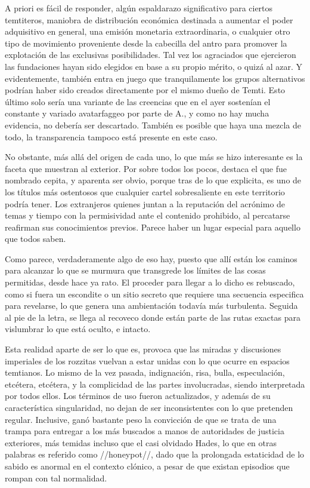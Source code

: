 \documentclass[
]{book}
\begin{document}
A priori es fácil de responder, algún espaldarazo significativo para ciertos temtiteros, maniobra de distribución económica destinada a aumentar el poder adquisitivo en general, una emisión monetaria extraordinaria, o cualquier otro tipo de movimiento proveniente desde la cabecilla del antro para promover la explotación de las exclusivas posibilidades. Tal vez los agraciados que ejercieron las fundaciones hayan sido elegidos en base a su propio mérito, o quizá al azar. Y evidentemente, también entra en juego que tranquilamente los grupos alternativos podrían haber sido creados directamente por el mismo dueño de Temti. Esto último solo sería una variante de las creencias que en el ayer sostenían el constante y variado avatarfaggeo por parte de A., y como no hay mucha evidencia, no debería ser descartado. También es posible que haya una mezcla de todo, la transparencia tampoco está presente en este caso.

No obstante, más allá del origen de cada uno, lo que más se hizo interesante es la faceta que muestran al exterior. Por sobre todos los pocos, destaca el que fue nombrado cepita, y aparenta ser obvio, porque tras de lo que explicita, es uno de los títulos más ostentosos que cualquier cartel sobresaliente en este territorio podría tener. Los extranjeros quienes juntan a la reputación del acrónimo de temas y tiempo con la permisividad ante el contenido prohibido, al percatarse reafirman sus conocimientos previos. Parece haber un lugar especial para aquello que todos saben.

Como parece, verdaderamente algo de eso hay, puesto que allí están los caminos para alcanzar lo que se murmura que transgrede los límites de las cosas permitidas, desde hace ya rato. El proceder para llegar a lo dicho es rebuscado, como si fuera un escondite o un sitio secreto que requiere una secuencia especifica para revelarse, lo que genera una ambientación todavía más turbulenta. Seguida al pie de la letra, se llega al recoveco donde están parte de las rutas exactas para vislumbrar lo que está oculto, e intacto.

Esta realidad aparte de ser lo que es, provoca que las miradas y discusiones imperiales de los rozzitas vuelvan a estar unidas con lo que ocurre en espacios temtianos. Lo mismo de la vez pasada, indignación, risa, bulla, especulación, etcétera, etcétera, y la complicidad de las partes involucradas, siendo interpretada por todos ellos. Los términos de uso fueron actualizados, y además de su característica singularidad, no dejan de ser inconsistentes con lo que pretenden regular. Inclusive, ganó bastante peso la convicción de que se trata de una trampa para entregar a los más buscados a manos de autoridades de justicia exteriores, más temidas incluso que el casi olvidado Hades, lo que en otras palabras es referido como //honeypot//, dado que la prolongada estaticidad de lo sabido es anormal en el contexto clónico, a pesar de que existan episodios que rompan con tal normalidad.
\end{document}
